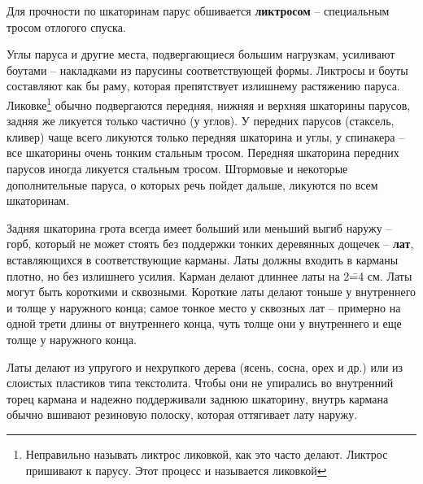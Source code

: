 \documentclass[a4paper, 12pt, twoside, final]{scrbook}
\begin{document}
Для прочности по шкаторинам парус обшивается \textbf{ликтросом} \---
специальным тросом отлогого спуска.

Углы паруса и другие места, подвергающиеся большим нагрузкам, усиливают
боутами \--- накладками из парусины соответствующей формы. Ликтросы и боуты
составляют как бы раму, которая препятствует излишнему растяжению
паруса. Ликовке\footnote{Неправильно называть ликтрос ликовкой, как это часто делают. Ликтрос
пришивают к парусу. Этот процесс и называется ликовкой} обычно подвергаются передняя, нижняя и верхняя шкаторины парусов,
задняя же ликуется только частично (у углов). У передних парусов (стаксель,
кливер) чаще всего ликуются только передняя шкаторина и углы, у спинакера
\--- все шкаторины очень тонким стальным тросом. Передняя шкаторина передних
парусов иногда ликуется стальным тросом. Штормовые и некоторые дополнительные
паруса, о которых речь пойдет дальше, ликуются по всем шкаторинам. 

Задняя шкаторина грота всегда имеет больший или меньший выгиб наружу
\--- горб, который не может стоять без поддержки тонких деревянных дощечек
\--- \textbf{лат}, вставляющихся в соответствующие карманы. Латы должны
входить в карманы плотно, но без излишнего усилия. Карман делают длиннее
латы на 2\==4 см. Латы могут быть короткими и сквозными. Короткие латы
делают тоньше у внутреннего и толще у наружного конца; самое тонкое
место у сквозных лат \--- примерно на одной трети длины от внутреннего
конца, чуть толще они у внутреннего и еще толще у наружного конца.

Латы делают из упругого и нехрупкого дерева (ясень, сосна, орех и
др.) или из слоистых пластиков типа текстолита. Чтобы они не упирались
во внутренний торец кармана и надежно поддерживали заднюю шкаторину,
внутрь кармана обычно вшивают резиновую полоску, которая оттягивает
лату наружу.
\end{document}
